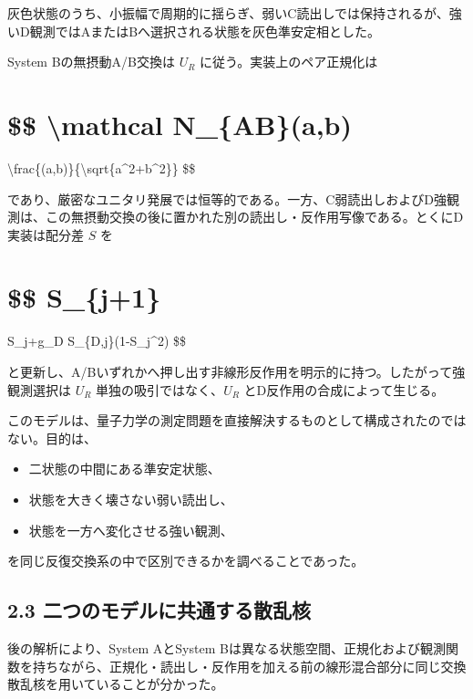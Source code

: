 \documentclass[
  a4paper,
  10pt]{article}
\providecommand{\tightlist}{%
  \setlength{\itemsep}{0pt}\setlength{\parskip}{0pt}}
\begin{document}
灰色状態のうち、小振幅で周期的に揺らぎ、弱いC読出しでは保持されるが、強いD観測ではAまたはBへ選択される状態を灰色準安定相とした。

System Bの無摂動A/B交換は \(U_R\) に従う。実装上のペア正規化は

\section{\$\$ \textbackslash mathcal
N\_\{AB\}(a,b)}\label{-mathcal-n_abab}

\textbackslash frac\{(a,b)\}\{\textbackslash sqrt\{\textbar a\textbar\^{}2+\textbar b\textbar\^{}2\}\}
\$\$

であり、厳密なユニタリ発展では恒等的である。一方、C弱読出しおよびD強観測は、この無摂動交換の後に置かれた別の読出し・反作用写像である。とくにD実装は配分差
\(S\) を

\section{\$\$ S\_\{j+1\}}\label{-s_j1}

S\_j+g\_D S\_\{D,j\}(1-S\_j\^{}2) \$\$

と更新し、A/Bいずれかへ押し出す非線形反作用を明示的に持つ。したがって強観測選択は
\(U_R\) 単独の吸引ではなく、\(U_R\) とD反作用の合成によって生じる。

このモデルは、量子力学の測定問題を直接解決するものとして構成されたのではない。目的は、

\begin{itemize}
\tightlist
\item
  二状態の中間にある準安定状態、
\item
  状態を大きく壊さない弱い読出し、
\item
  状態を一方へ変化させる強い観測、
\end{itemize}

を同じ反復交換系の中で区別できるかを調べることであった。

\subsection{2.3
二つのモデルに共通する散乱核}\label{23-ux4e8cux3064ux306eux30e2ux30c7ux30ebux306bux5171ux901aux3059ux308bux6563ux4e71ux6838}

後の解析により、System AとSystem
Bは異なる状態空間、正規化および観測関数を持ちながら、正規化・読出し・反作用を加える前の線形混合部分に同じ交換散乱核を用いていることが分かった。
\end{document}
